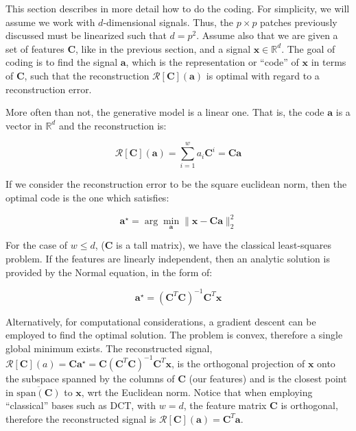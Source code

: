 \documentclass[12pt,a4paper,oneside,english]{UPBThesis}
\newcommand{\hctimes}[2]{{#1}\!\times\!{#2}}
\newcommand{\hcsignalspace}{\mathbb{R}^d}
\begin{document}
This section describes in more detail how to do the coding. For simplicity, we will assume we work with $d$-dimensional signals. Thus, the $\hctimes{p}{p}$ patches previously discussed must be linearized such that $d = p^2$. Assume also that we are given a set of features $\textbf{C}$, like in the previous section, and a signal $\textbf{x} \in \hcsignalspace$. The goal of coding is to find the signal $\textbf{a}$, which is the representation or ``code'' of $\textbf{x}$ in terms of $\textbf{C}$, such that the reconstruction $\mathcal{R}[\textbf{C}](\textbf{a})$ is optimal with regard to a reconstruction error.

More often than not, the generative model is a linear one. That is, the code $\textbf{a}$ is a vector in $\hcsignalspace$ and the reconstruction is:

\begin{equation*}
\mathcal{R}[\textbf{C}](\textbf{a}) = \sum_{i=1}^{w}{a_i \textbf{C}^i} = \textbf{C}\textbf{a}
\end{equation*}

If we consider the reconstruction error to be the square euclidean norm, then the optimal code is the one which satisfies:

\begin{equation}
\textbf{a}^{\star} = \arg\min_{\textbf{a}} \| \textbf{x} - \textbf{C}\textbf{a} \|_2^2
\end{equation}

For the case of $w \leq d$, ($\textbf{C}$ is a tall matrix), we have the classical least-squares problem. If the features are linearly independent, then an analytic solution is provided by the Normal equation, in the form of:

\begin{equation}
\textbf{a}^{\star} = (\textbf{C}^T\textbf{C})^{-1}\textbf{C}^T\textbf{x}
\end{equation}

Alternatively, for computational considerations, a gradient descent can be employed to find the optimal solution. The problem is convex, therefore a single global minimum exists. The reconstructed signal, $\mathcal{R}[\textbf{C}](a) = \textbf{C}\textbf{a}^{\star} = \textbf{C}(\textbf{C}^T\textbf{C})^{-1}\textbf{C}^T\textbf{x}$, is the orthogonal projection of $\textbf{x}$ onto the subspace spanned by the columns of $\textbf{C}$ (our features) and is the closest point in $\overline{\text{span}(\textbf{C})}$ to $\textbf{x}$, wrt the Euclidean norm. Notice that when employing ``classical'' bases such as DCT, with $w = d$, the feature matrix $\textbf{C}$ is orthogonal, therefore the reconstructed signal is $\mathcal{R}[\textbf{C}](\textbf{a}) = \textbf{C}^T\textbf{a}$.
\end{document}
